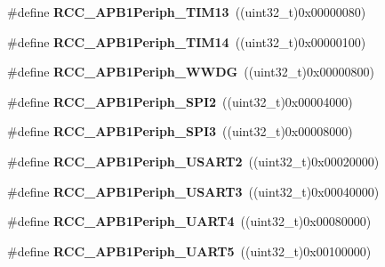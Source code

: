 \begin{DoxyCompactItemize}
\item 
\hypertarget{group__APB1__peripheral_ga34397b722f46f31e898136fb51a7523a}{
\#define {\bfseries RCC\_\-APB1Periph\_\-TIM13}~((uint32\_\-t)0x00000080)}
\label{group__APB1__peripheral_ga34397b722f46f31e898136fb51a7523a}

\item 
\hypertarget{group__APB1__peripheral_ga7100c45768eea1484f6fd519b53e287d}{
\#define {\bfseries RCC\_\-APB1Periph\_\-TIM14}~((uint32\_\-t)0x00000100)}
\label{group__APB1__peripheral_ga7100c45768eea1484f6fd519b53e287d}

\item 
\hypertarget{group__APB1__peripheral_gad84e40be78ddc40b8eae1c2b0898f6b1}{
\#define {\bfseries RCC\_\-APB1Periph\_\-WWDG}~((uint32\_\-t)0x00000800)}
\label{group__APB1__peripheral_gad84e40be78ddc40b8eae1c2b0898f6b1}

\item 
\hypertarget{group__APB1__peripheral_gaa21f1dfb4fcf241c6f85a048eaca29df}{
\#define {\bfseries RCC\_\-APB1Periph\_\-SPI2}~((uint32\_\-t)0x00004000)}
\label{group__APB1__peripheral_gaa21f1dfb4fcf241c6f85a048eaca29df}

\item 
\hypertarget{group__APB1__peripheral_gabb0b40e839ef7403b086482e89d56f35}{
\#define {\bfseries RCC\_\-APB1Periph\_\-SPI3}~((uint32\_\-t)0x00008000)}
\label{group__APB1__peripheral_gabb0b40e839ef7403b086482e89d56f35}

\item 
\hypertarget{group__APB1__peripheral_gaa69c77220b943a42a4bacb8a3bf87dd0}{
\#define {\bfseries RCC\_\-APB1Periph\_\-USART2}~((uint32\_\-t)0x00020000)}
\label{group__APB1__peripheral_gaa69c77220b943a42a4bacb8a3bf87dd0}

\item 
\hypertarget{group__APB1__peripheral_gaf72838a63d7d6200f251c1eb334cbaac}{
\#define {\bfseries RCC\_\-APB1Periph\_\-USART3}~((uint32\_\-t)0x00040000)}
\label{group__APB1__peripheral_gaf72838a63d7d6200f251c1eb334cbaac}

\item 
\hypertarget{group__APB1__peripheral_ga839d7ae3386622158210ecf53d9cd989}{
\#define {\bfseries RCC\_\-APB1Periph\_\-UART4}~((uint32\_\-t)0x00080000)}
\label{group__APB1__peripheral_ga839d7ae3386622158210ecf53d9cd989}

\item 
\hypertarget{group__APB1__peripheral_gaa00c73f88a7af45fb29df97b07acd856}{
\#define {\bfseries RCC\_\-APB1Periph\_\-UART5}~((uint32\_\-t)0x00100000)}
\label{group__APB1__peripheral_gaa00c73f88a7af45fb29df97b07acd856}


\end{DoxyCompactItemize}
